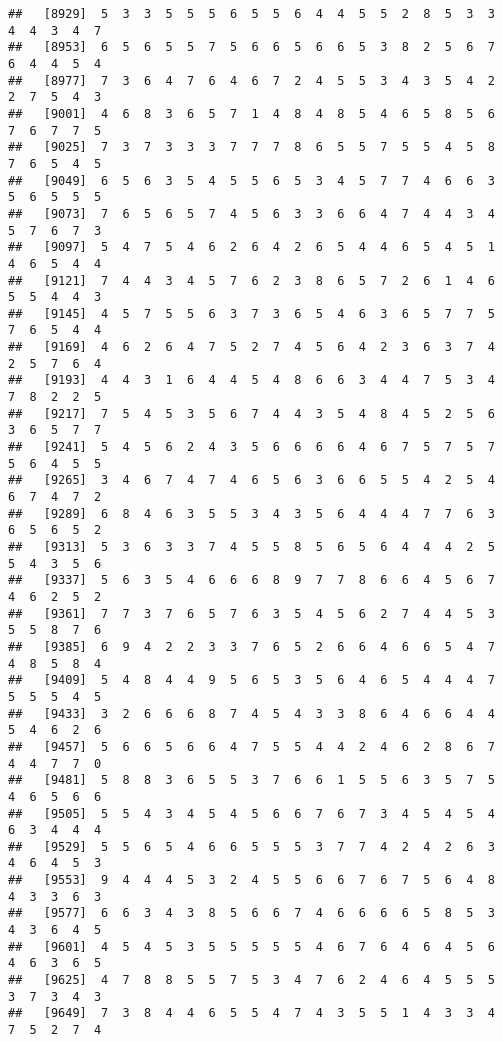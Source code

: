 \documentclass[
]{book}
\begin{document}
\begin{verbatim}
##   [8929]  5  3  3  5  5  5  6  5  5  6  4  4  5  5  2  8  5  3  3  4  4  3  4  7
##   [8953]  6  5  6  5  5  7  5  6  6  5  6  6  5  3  8  2  5  6  7  6  4  4  5  4
##   [8977]  7  3  6  4  7  6  4  6  7  2  4  5  5  3  4  3  5  4  2  2  7  5  4  3
##   [9001]  4  6  8  3  6  5  7  1  4  8  4  8  5  4  6  5  8  5  6  7  6  7  7  5
##   [9025]  7  3  7  3  3  3  7  7  7  8  6  5  5  7  5  5  4  5  8  7  6  5  4  5
##   [9049]  6  5  6  3  5  4  5  5  6  5  3  4  5  7  7  4  6  6  3  5  6  5  5  5
##   [9073]  7  6  5  6  5  7  4  5  6  3  3  6  6  4  7  4  4  3  4  5  7  6  7  3
##   [9097]  5  4  7  5  4  6  2  6  4  2  6  5  4  4  6  5  4  5  1  4  6  5  4  4
##   [9121]  7  4  4  3  4  5  7  6  2  3  8  6  5  7  2  6  1  4  6  5  5  4  4  3
##   [9145]  4  5  7  5  5  6  3  7  3  6  5  4  6  3  6  5  7  7  5  7  6  5  4  4
##   [9169]  4  6  2  6  4  7  5  2  7  4  5  6  4  2  3  6  3  7  4  2  5  7  6  4
##   [9193]  4  4  3  1  6  4  4  5  4  8  6  6  3  4  4  7  5  3  4  7  8  2  2  5
##   [9217]  7  5  4  5  3  5  6  7  4  4  3  5  4  8  4  5  2  5  6  3  6  5  7  7
##   [9241]  5  4  5  6  2  4  3  5  6  6  6  6  4  6  7  5  7  5  7  5  6  4  5  5
##   [9265]  3  4  6  7  4  7  4  6  5  6  3  6  6  5  5  4  2  5  4  6  7  4  7  2
##   [9289]  6  8  4  6  3  5  5  3  4  3  5  6  4  4  4  7  7  6  3  6  5  6  5  2
##   [9313]  5  3  6  3  3  7  4  5  5  8  5  6  5  6  4  4  4  2  5  5  4  3  5  6
##   [9337]  5  6  3  5  4  6  6  6  8  9  7  7  8  6  6  4  5  6  7  4  6  2  5  2
##   [9361]  7  7  3  7  6  5  7  6  3  5  4  5  6  2  7  4  4  5  3  5  5  8  7  6
##   [9385]  6  9  4  2  2  3  3  7  6  5  2  6  6  4  6  6  5  4  7  4  8  5  8  4
##   [9409]  5  4  8  4  4  9  5  6  5  3  5  6  4  6  5  4  4  4  7  5  5  5  4  5
##   [9433]  3  2  6  6  6  8  7  4  5  4  3  3  8  6  4  6  6  4  4  5  4  6  2  6
##   [9457]  5  6  6  5  6  6  4  7  5  5  4  4  2  4  6  2  8  6  7  4  4  7  7  0
##   [9481]  5  8  8  3  6  5  5  3  7  6  6  1  5  5  6  3  5  7  5  4  6  5  6  6
##   [9505]  5  5  4  3  4  5  4  5  6  6  7  6  7  3  4  5  4  5  4  6  3  4  4  4
##   [9529]  5  5  6  5  4  6  6  5  5  5  3  7  7  4  2  4  2  6  3  4  6  4  5  3
##   [9553]  9  4  4  4  5  3  2  4  5  5  6  6  7  6  7  5  6  4  8  4  3  3  6  3
##   [9577]  6  6  3  4  3  8  5  6  6  7  4  6  6  6  6  5  8  5  3  4  3  6  4  5
##   [9601]  4  5  4  5  3  5  5  5  5  5  4  6  7  6  4  6  4  5  6  4  6  3  6  5
##   [9625]  4  7  8  8  5  5  7  5  3  4  7  6  2  4  6  4  5  5  5  3  7  3  4  3
##   [9649]  7  3  8  4  4  6  5  5  4  7  4  3  5  5  1  4  3  3  4  7  5  2  7  4

\end{verbatim}
\end{document}
